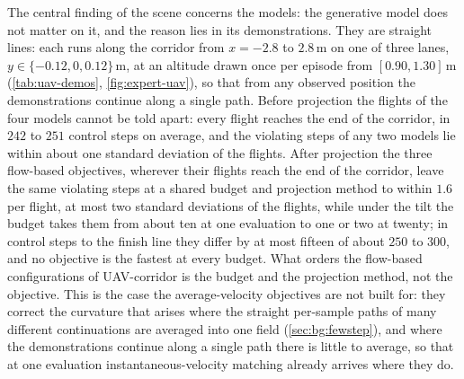 The central finding of the scene concerns the models: the generative model does not matter on it, and the
reason lies in its demonstrations. They are straight lines: each runs along the corridor from $x=-2.8$ to
$2.8$\,m on one of three lanes, $y\in\{-0.12,0,0.12\}$\,m, at an altitude drawn once per episode from
$[0.90,1.30]$\,m (\autoref{tab:uav-demos}, \autoref{fig:expert-uav}), so that from any observed position the demonstrations
continue along a single path. Before projection the flights of the four models cannot be told apart: every
flight reaches the end of the corridor, in $242$ to $251$ control steps on average, and the violating steps
of any two models lie within about one standard deviation of the flights. After projection the three
flow-based objectives, wherever their flights reach the end of the corridor, leave the same violating steps
at a shared budget and projection method to within $1.6$ per flight, at most two standard deviations of the
flights, while under the tilt the budget takes them from about ten at one evaluation to one or two at
twenty; in control steps to the finish line they differ by at most fifteen of about $250$ to $300$, and no
objective is the fastest at every budget. What orders the flow-based configurations of UAV-corridor is the
budget and the projection method, not the objective. This is the case the average-velocity objectives are
not built for: they correct the curvature that arises where the straight per-sample paths of many different
continuations are averaged into one field (\autoref{sec:bg:fewstep}), and where the demonstrations continue
along a single path there is little to average, so that at one evaluation instantaneous-velocity matching
already arrives where they do.

